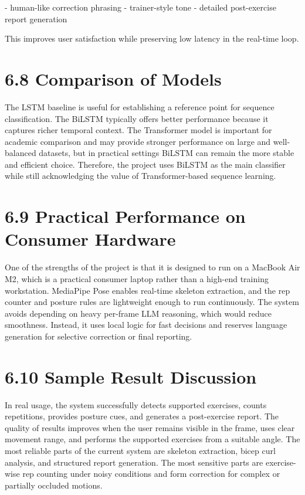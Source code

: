 \documentclass[12pt,a4paper]{report}
\begin{document}
- human-like correction phrasing  
- trainer-style tone  
- detailed post-exercise report generation

This improves user satisfaction while preserving low latency in the real-time loop.

\section{6.8 Comparison of Models}
The LSTM baseline is useful for establishing a reference point for sequence classification. The BiLSTM typically offers better performance because it captures richer temporal context. The Transformer model is important for academic comparison and may provide stronger performance on large and well-balanced datasets, but in practical settings BiLSTM can remain the more stable and efficient choice. Therefore, the project uses BiLSTM as the main classifier while still acknowledging the value of Transformer-based sequence learning.

\section{6.9 Practical Performance on Consumer Hardware}
One of the strengths of the project is that it is designed to run on a MacBook Air M2, which is a practical consumer laptop rather than a high-end training workstation. MediaPipe Pose enables real-time skeleton extraction, and the rep counter and posture rules are lightweight enough to run continuously. The system avoids depending on heavy per-frame LLM reasoning, which would reduce smoothness. Instead, it uses local logic for fast decisions and reserves language generation for selective correction or final reporting.

\section{6.10 Sample Result Discussion}
In real usage, the system successfully detects supported exercises, counts repetitions, provides posture cues, and generates a post-exercise report. The quality of results improves when the user remains visible in the frame, uses clear movement range, and performs the supported exercises from a suitable angle. The most reliable parts of the current system are skeleton extraction, bicep curl analysis, and structured report generation. The most sensitive parts are exercise-wise rep counting under noisy conditions and form correction for complex or partially occluded motions.
\end{document}
